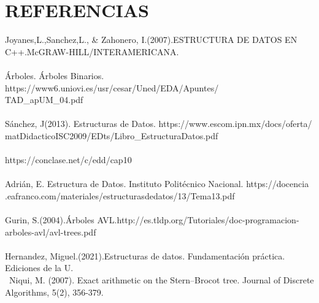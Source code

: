 \documentclass{report}
\begin{document}
\section{REFERENCIAS}
Joyanes,L.,Sanchez,L., & Zahonero, I.(2007).ESTRUCTURA DE DATOS EN C++.McGRAW-HILL/INTERAMERICANA.\\\\
Árboles. Árboles Binarios. https://www6.uniovi.es/usr/cesar/Uned/EDA/Apuntes/\\TAD_apUM_04.pdf\\\\
Sánchez, J(2013). Estructuras de Datos. https://www.escom.ipn.mx/docs/oferta/\\matDidacticoISC2009/EDts/Libro_EstructuraDatos.pdf\\\\
https://conclase.net/c/edd/cap10\\\\
Adrián, E. Estructura de Datos. Instituto Politécnico Nacional. https://docencia\\.eafranco.com/materiales/estructurasdedatos/13/Tema13.pdf\\\\
Gurin, S.(2004).Árboles AVL.http://es.tldp.org/Tutoriales/doc-programacion-arboles-avl/avl-trees.pdf\\\\
Hernandez, Miguel.(2021).Estructuras de datos. Fundamentación práctica.\\Ediciones de la U.\\\
Niqui, M. (2007). Exact arithmetic on the Stern–Brocot tree. Journal of Discrete Algorithms, 5(2), 356-379.\\\
\end{document}
